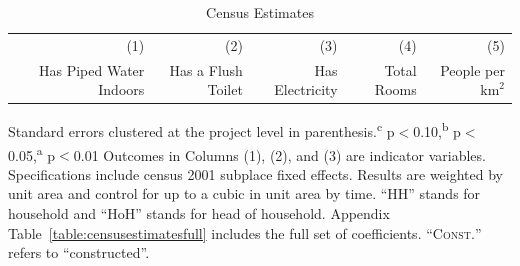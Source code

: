 \documentclass[12pt]{article}
\begin{document}
\begin{table}
\small
\centering
\caption{Census Estimates}\label{table:censusestimates}
\vspace{-2mm}
\begin{threeparttable}
\begin{tabular}{lDDDDD}
\toprule
 & \small (1) & \small (2)  & \small (3) & \small (4) & \small (5)   \\
 & \small Has Piped Water Indoors & \small Has a Flush Toilet &  \small Has Electricity & \small Total Rooms & \small People per $\text{km}^{2}$ \\ \midrule
\bottomrule
\end{tabular}
\begin{tablenotes}
\item Standard errors clustered at the project level in parenthesis.\textsuperscript{c} p$<$0.10,\textsuperscript{b} p$<$0.05,\textsuperscript{a} p$<$0.01
Outcomes in Columns (1), (2), and (3) are indicator variables.
Specifications include census 2001 subplace fixed effects.
Results are weighted by unit area and control for up to a cubic in unit area by time. 
``HH'' stands for household and ``HoH'' stands for head of household.  Appendix Table~\ref{table:censusestimatesfull} includes the full set of coefficients. ``\textsc{Const.}'' refers to ``constructed''.
\end{tablenotes}
\end{threeparttable}
\end{table}


\begin{table}
\small
\centering
\caption{Census Estimates}\label{table:censusestimates}
\vspace{-2mm}
\end{table}
\end{document}
